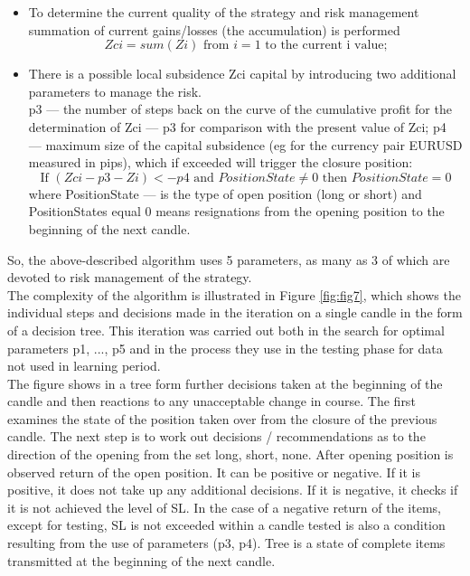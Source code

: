 \documentclass[runningheads,a4paper]{llncs}
\begin{document}
\begin{itemize}
\item To determine the current quality of the strategy and risk management summation of current gains/losses (the accumulation) is performed
\begin{equation}
Zci = sum ( Zi ) \text{ from } i = 1 \text{ to the current i value;}
\end{equation}
\item There is a possible local subsidence Zci capital by introducing two additional parameters to manage the risk.\\
p3 --- the number of steps back on the curve of the cumulative profit for the determination of Zci --- p3 for comparison with the present value of Zci;
p4 --- maximum size of the capital subsidence (eg for the currency pair EURUSD measured in pips), which if exceeded will trigger the closure position:\\
\begin{equation}
\text{If } ( Zci - p3 - Zi ) <- p4 \text{ and } PositionState \neq 0 \text{ then } PositionState = 0
\end{equation} 
where PositionState --- is the type of open position (long or short) and PositionStates equal 0 means resignations from the opening position to the beginning of the next candle.
\end{itemize}
So, the above-described algorithm uses 5 parameters, as many as 3 of which are devoted to risk management of the strategy.\\
The complexity of the algorithm is illustrated in Figure \ref{fig:fig7}, which shows the individual steps and decisions made in the iteration on a single candle in the form of a decision tree. This iteration was carried out both in the search for optimal parameters p1, ..., p5 and in the process they use in the testing phase for data not used in learning period.\\

The figure shows in a tree form further decisions taken at the beginning of the candle and then reactions to any unacceptable change in course. The first examines the state of the position taken over from the closure of the previous candle. The next step is to work out decisions / recommendations as to the direction of the opening from the set {long, short, none}. After opening position is observed return of the open position. It can be positive or negative. If it is positive, it does not take up any additional decisions. If it is negative, it checks if it is not achieved the level of SL. In the case of a negative return of the items, except for testing, SL is not exceeded within a candle tested is also a condition resulting from the use of parameters (p3, p4). Tree is a state of complete items transmitted at the beginning of the next candle.
\end{document}

